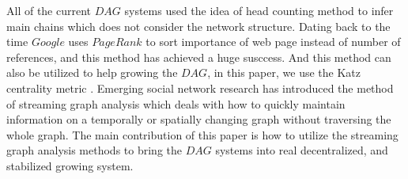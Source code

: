 All of the current $DAG$ systems used the idea of head counting method to infer main chains which does not consider the network structure.
Dating back to the time $Google$ uses $PageRank$ \cite{page1999pagerank} to sort importance of web page instead of number of references, and this method has achieved a huge susccess.
And this method can also be utilized to help growing the $DAG$, in this paper, we use the Katz centrality metric \cite{katz1953new}.
Emerging social network research has introduced the method of streaming graph analysis \cite{ediger2011tracking, green2012fast, ediger2012stinger} which deals
with how to quickly maintain information on a temporally or spatially changing graph without traversing the whole graph. 
The main contribution of this paper is how to utilize the streaming graph analysis methods to bring the $DAG$ systems into real decentralized, and stabilized growing system.
